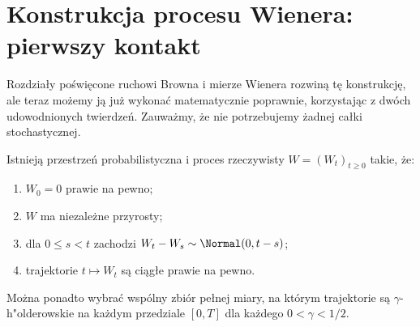 \section{Konstrukcja procesu Wienera: pierwszy kontakt}
Rozdziały poświęcone ruchowi Browna i mierze Wienera
rozwiną tę konstrukcję, ale teraz możemy ją już wykonać
matematycznie poprawnie, korzystając z dwóch udowodnionych
twierdzeń. Zauważmy, że nie potrzebujemy żadnej całki
stochastycznej.

\begin{twierdzenie}
\label{thm:wiener-exists}
Istnieją przestrzeń probabilistyczna i proces rzeczywisty
$W=(W_t)_{t\ge0}$ takie, że:
\begin{enumerate}
\item $W_0=0$ prawie na pewno;
\item $W$ ma niezależne przyrosty;
\item dla $0\le s<t$ zachodzi
$W_t-W_s\sim\Normal(0,t-s)$;
\item trajektorie $t\mapsto W_t$ są ciągłe prawie na pewno.
\end{enumerate}
Można ponadto wybrać wspólny zbiór pełnej miary,
na którym trajektorie są $\gamma$-h"olderowskie
na każdym przedziale $[0,T]$ dla każdego $0<\gamma<1/2$.
\end{twierdzenie}
